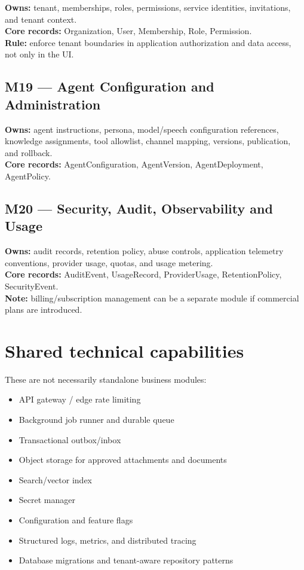 \textbf{Owns:} tenant, memberships, roles, permissions, service identities, invitations, and tenant context. \\ \textbf{Core records:} Organization, User, Membership, Role, Permission. \\ \textbf{Rule:} enforce tenant boundaries in application authorization and data access, not only in the UI.

\subsection{M19 --- Agent Configuration and Administration}

\textbf{Owns:} agent instructions, persona, model/speech configuration references, knowledge assignments, tool allowlist, channel mapping, versions, publication, and rollback. \\ \textbf{Core records:} AgentConfiguration, AgentVersion, AgentDeployment, AgentPolicy.

\subsection{M20 --- Security, Audit, Observability and Usage}

\textbf{Owns:} audit records, retention policy, abuse controls, application telemetry conventions, provider usage, quotas, and usage metering. \\ \textbf{Core records:} AuditEvent, UsageRecord, ProviderUsage, RetentionPolicy, SecurityEvent. \\ \textbf{Note:} billing/subscription management can be a separate module if commercial plans are introduced.

\section{Shared technical capabilities}

These are not necessarily standalone business modules:

\begin{itemize}
\item API gateway / edge rate limiting
\item Background job runner and durable queue
\item Transactional outbox/inbox
\item Object storage for approved attachments and documents
\item Search/vector index
\item Secret manager
\item Configuration and feature flags
\item Structured logs, metrics, and distributed tracing
\item Database migrations and tenant-aware repository patterns
\end{itemize}
